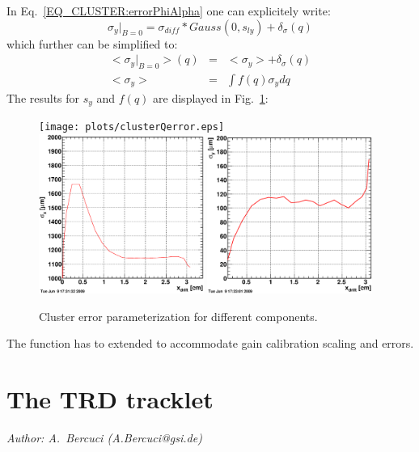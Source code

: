 \documentclass{alicetdr}
\begin{document}
In Eq.~\ref{EQ_CLUSTER:errorPhiAlpha} one can explicitely write:
\begin{equation}
\sigma_{y}|_{B=0} = \sigma_{diff}*Gauss(0, s_{ly}) + \delta_{\sigma}(q)
\end{equation}
which further can be simplified to:
\begin{eqnarray}
<\sigma_{y}|_{B=0}>(q) &=& <\sigma_{y}> + \delta_{\sigma}(q)\\
<\sigma_{y}> &=& \int{f(q)\sigma_{y}dq}
\end{eqnarray}
The results for $s_y$ and $f(q)$ are displayed in Fig.~\ref{FIG_CLUSTER:errorCharge}:
\begin{figure}[htb]
\begin{center}
\texttt{[image: plots/clusterQerror.eps]}
\includegraphics[width=0.48\textwidth]{plots/clusterSX.eps}
\includegraphics[width=0.48\textwidth]{plots/clusterSY.eps}
\end{center}
\caption{
Cluster error parameterization for different components.}
\label{FIG_CLUSTER:errorCharge}
\end{figure}
The function has to extended to accommodate gain calibration scaling and errors.

%
\setcounter{footnote}{0}
\section{The TRD tracklet}\label{REC:Tracklet:}
{\it Author: A.~Bercuci (A.Bercuci@gsi.de)}\\
\end{document}

